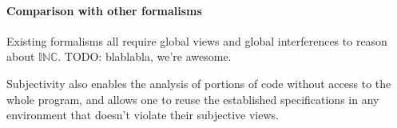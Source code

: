 \paragraph{Comparison with other formalisms}
Existing formalisms all require global views and global interferences
to reason about $\mathbb{INC}$. TODO: blablabla, we're awesome.



Subjectivity also enables the analysis of
portions of code without access to the whole program, and allows one
to reuse the established specifications in any environment that
doesn't violate their subjective views.





